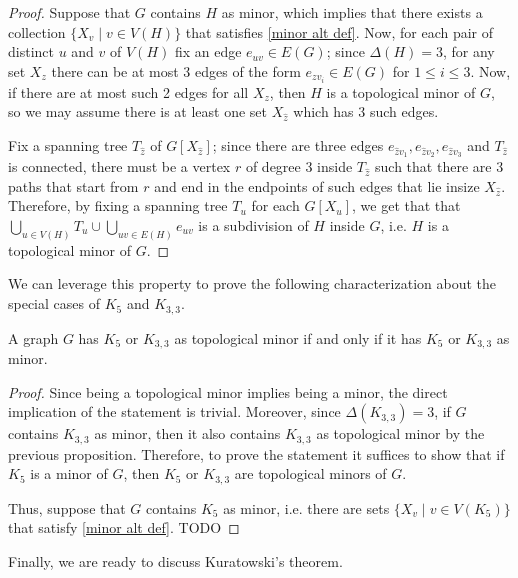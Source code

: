 \documentclass[a4paper, 12pt]{report}
\begin{document}
    \begin{proof}
        Suppose that $G$ contains $H$ as minor, which implies that there exists a collection $\{X_v \mid v \in V(H)\}$ that satisfies \cref{minor alt def}. Now, for each pair of distinct $u$ and $v$ of $V(H)$ fix an edge $e_{uv} \in E(G)$; since $\Delta(H) = 3$, for any set $X_z$ there can be at most 3 edges of the form $e_{zv_i} \in E(G)$ for $1 \le i \le 3$. Now, if there are at most such 2 edges for all $X_z$, then $H$ is a topological minor of $G$, so we may assume there is at least one set $X_{\hat z}$ which has 3 such edges.
 
        Fix a spanning tree $T_{\hat z}$ of $G[X_{\hat z}]$; since there are three edges $e_{\hat zv_1}, e_{\hat zv_2}, e_{\hat zv_3}$ and $T_{\hat z}$ is connected, there must be a vertex $r$ of degree 3 inside $T_{\hat z}$ such that there are 3 paths that start from $r$ and end in the endpoints of such edges that lie insize $X_{\hat z}$. Therefore, by fixing a spanning tree $T_u$ for each $G[X_u]$, we get that that $\displaystyle \bigcup_{u \in V(H)}{T_u} \cup \bigcup_{uv \in E(H)}{e_{uv}}$ is a subdivision of $H$ inside $G$, i.e. $H$ is a topological minor of $G$.
    \end{proof}

    We can leverage this property to prove the following characterization about the special cases of $K_5$ and $K_{3,3}$.

    \begin{framedlem}[label={kuratowski lemma}]{}
        A graph $G$ has $K_5$ or $K_{3,3}$ as topological minor if and only if it has $K_5$ or $K_{3,3}$ as minor.
    \end{framedlem}

    \begin{proof}
        Since being a topological minor implies being a minor, the direct implication of the statement is trivial. Moreover, since $\Delta(K_{3,3}) = 3$, if $G$ contains $K_{3,3}$ as minor, then it also contains $K_{3,3}$ as topological minor by the previous proposition. Therefore, to prove the statement it suffices to show that if $K_5$ is a minor of $G$, then $K_5$ or $K_{3,3}$ are topological minors of $G$.

        Thus, suppose that $G$ contains $K_5$ as minor, i.e. there are sets $\{X_v \mid v \in V(K_5)\}$ that satisfy \cref{minor alt def}. TODO 
    \end{proof}

    Finally, we are ready to discuss Kuratowski's theorem.
\end{document}
